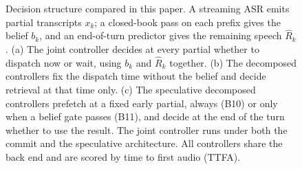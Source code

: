 \begin{figure}[t]
{%
}
\caption{Decision structure compared in this paper. A streaming ASR emits
partial transcripts $x_k$; a closed-book pass on each prefix gives the belief
$b_k$, and an end-of-turn predictor gives the remaining speech $\hat R_k$.
(a) The joint controller decides at every partial whether to dispatch now or
wait, using $b_k$ and $\hat R_k$ together. (b) The decomposed controllers fix
the dispatch time without the belief and decide retrieval at that time only.
(c) The speculative decomposed controllers prefetch at a fixed early partial,
always (B10) or only when a belief gate passes (B11), and decide at the end of
the turn whether to use the result. The joint controller runs under both the
commit and the speculative architecture. All controllers share the back end and
are scored by time to first audio (TTFA).}
\label{fig:arch}
\end{figure}
